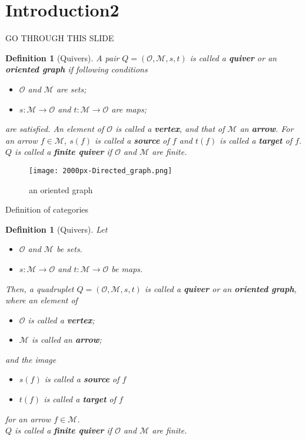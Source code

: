 \documentclass[dvipdfmx,10pt,notheorems]{beamer}
\newtheorem{definition}[theorem]{Definition}
\renewcommand{\#}{^\sharp}
\begin{document}
\section{Introduction2}
	\begin{frame}{GO THROUGH THIS SLIDE}
			\begin{definition}[Quivers]					
					A pair $Q=(\mathcal{O},\mathcal{M},s,t)$ is called a {\bf quiver} or an {\bf oriented graph} if
					following conditions
							\begin{itemize}
									\item $\mathcal{O}$ and $\mathcal{M}$ are sets;
									\item $s:\mathcal{M}\rightarrow\mathcal{O}$ and $t:\mathcal{M}\rightarrow\mathcal{O}$
									are maps;
							\end{itemize}
					are satisfied.
					An element of $\mathcal{O}$ is called a {\bf vertex}, and that of  $\mathcal{M}$ an {\bf arrow}.
					For an arrow $f\in\mathcal{M}$, $s(f)$ is called a {\bf source} of $f$ and $t(f)$ is called a {\bf target} of $f$.
					$Q$ is called a {\bf finite quiver} if $\mathcal{O}$ and $\mathcal{M}$ are finite.
			\end{definition}
			\begin{figure}
					\texttt{[image: 2000px-Directed\_graph.png]}
					\caption{an oriented graph}
					\label{ImageOfAnOrientedGraph}
			\end{figure}
	\end{frame}
	
	
	
	\begin{frame}{Definition of categories}
			\begin{definition}[Quivers]
					Let
							\begin{itemize}
									\item $\mathcal{O}$ and $\mathcal{M}$ be sets.
									\item $s:\mathcal{M}\rightarrow\mathcal{O}$ and $t:\mathcal{M}\rightarrow\mathcal{O}$
									be maps.
							\end{itemize}
					Then, a quadruplet $Q=(\mathcal{O},\mathcal{M},s,t)$ is called a {\bf quiver} or an {\bf oriented graph}, where
					an element of
							\begin{itemize}
									\item  $\mathcal{O}$ is called a {\bf vertex};
									\item  $\mathcal{M}$ is called an {\bf arrow};
							\end{itemize}
					and the image
							\begin{itemize}
									\item $s(f)$ is called a {\bf source} of $f$
									\item $t(f)$ is called a {\bf target} of $f$
							\end{itemize}
					for an arrow $f\in\mathcal{M}$.\\
					$Q$ is called a {\bf finite quiver} if $\mathcal{O}$ and $\mathcal{M}$ are finite.
			\end{definition}
	\end{frame}
\end{document}

